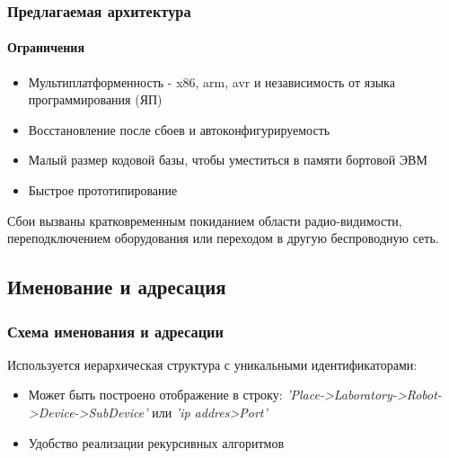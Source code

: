 \documentclass{beamer}
\begin{document}
\begin{frame}
\frametitle{Предлагаемая архитектура}

\framesubtitle{Ограничения}

\begin{itemize}
  \item Мультиплатформенность - x86, arm, avr и независимость от языка
  программирования (ЯП)
  \item Восстановление после сбоев и автоконфигурируемость
  \item Малый размер кодовой базы, чтобы уместиться в памяти бортовой ЭВМ
  \item Быстрое прототипирование
\end{itemize}

\small{
Сбои вызваны кратковременным покиданием области радио-видимости,
переподключением оборудования или переходом в другую беспроводную сеть.
}
\end{frame}

\subsection{Именование и адресация}
\begin{frame}
\frametitle{Схема именования и адресации}
Используется иерархическая структура с уникальными идентификаторами:
\begin{itemize}
  \item Может быть построено отображение в строку:
  \emph{'Place->Laboratory->Robot->Device->SubDevice'} или
  \emph{'ip addres>Port'}
  \item Удобство реализации рекурсивных алгоритмов
\end{itemize}

\end{frame}
\end{document}

